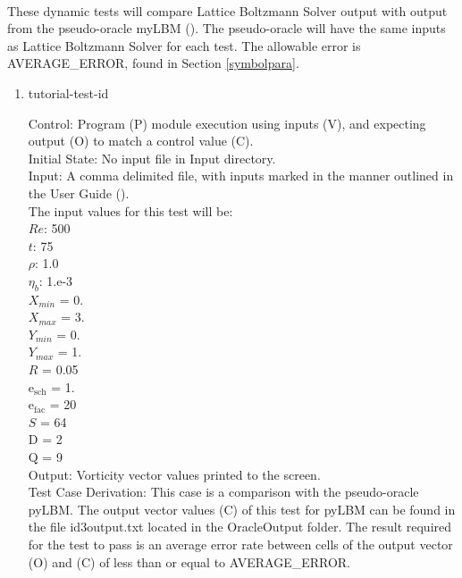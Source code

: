 \documentclass[12pt, titlepage]{article}
\newcommand{\famname}{Lattice Boltzmann Solver}
\newcounter{testcounter} %
\begin{document}
\paragraph{} These dynamic tests will compare {\famname} output with output from the pseudo-oracle myLBM (\citet{pylbmcode}). The pseudo-oracle will have the same inputs as {\famname} for each test. The allowable error is AVERAGE\_ERROR, found in Section \ref{symbolpara}.

\begin{enumerate}

\item{tutorial-test-id\thetestcounter \\}

Control: Program (P) module execution using inputs (V), and expecting output (O) to match a control value (C).\\
					
Initial State: No input file in Input directory.\\
					
Input: A comma delimited file, with inputs marked in the manner outlined in the User Guide (\citet{LBM_UserGuide_PM}).\\The input values for this test will be:\\
$Re$: 500\\
$t$: 75\\
$\rho$: 1.0\\
$\eta_b$: 1.e-3\\
$X_{min}$ = 0.\\
$X_{max}$ = 3.\\
$Y_{min}$ = 0.\\
$Y_{max}$ = 1.\\
$R$ = 0.05\\
$\mathrm{e_{sch}}$ = 1.\\
$\mathrm{e_{fac}}$ = 20\\
$S$ = 64\\
$\mathrm{D}$ = 2\\
$\mathrm{Q}$ = 9\\

		
Output: Vorticity vector values printed to the screen. \\

Test Case Derivation: This case is a comparison with the pseudo-oracle pyLBM. The output vector values (C) of this test for pyLBM can be found in the file id3output.txt located in the OracleOutput folder. The result required for the test to pass is an average error rate between cells of the output vector (O) and (C) of less than or equal to AVERAGE\_ERROR.\\



\end{enumerate}
\end{document}
